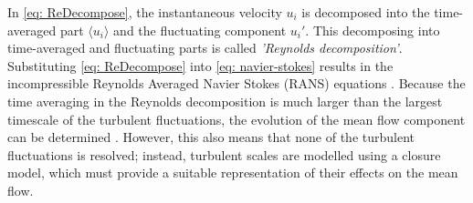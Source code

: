 %   

In \autoref{eq: ReDecompose}, the instantaneous velocity $u_i$ is decomposed into the time-averaged part $\langle u_i \rangle$ and the fluctuating component $u_i'$. This decomposing into time-averaged and fluctuating parts is called \textit{'Reynolds decomposition'}. Substituting \autoref{eq: ReDecompose} into \autoref{eq: navier-stokes} results in the incompressible Reynolds Averaged Navier Stokes (RANS) equations \cite{FiniteVolume}. Because the time averaging in the Reynolds decomposition is much larger than the largest timescale of the turbulent fluctuations, the evolution of the mean flow component can be determined \cite{Roelofs2019}. However, this also means that none of the turbulent fluctuations is resolved; instead, turbulent scales are modelled using a closure model, which must provide a suitable representation of their effects on the mean flow.

